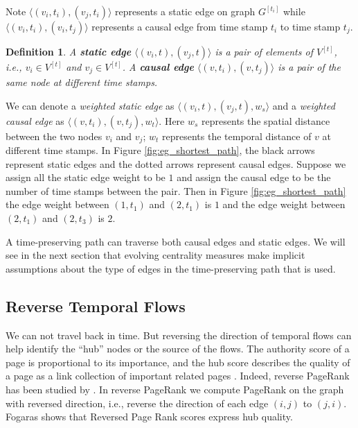 \documentclass[12pt]{article}
\newtheorem{definition}{Definition}
\theoremstyle{definition}
\begin{document}
Note $\langle (v_i, t_i), (v_j, t_i) \rangle$ represents a static edge on graph $G^{[t_i]}$ while $\langle (v_i, t_i), (v_i, t_j) \rangle$ represents a causal edge from time stamp $t_i$ to time stamp $t_j$.

\begin{definition}
A \textbf{static edge} $\langle (v_i, t), (v_j, t)\rangle$ is a pair of elements of $V^{[t]}$, i.e., $v_i \in V^{[t]}$ and
$v_j \in V^{[t]}$.
 A \textbf{causal edge} $\langle (v, t_i), (v, t_j)\rangle$ is a pair of the same node at different time stamps.
\end{definition}

We can denote a \emph{weighted static edge} as $\langle (v_i, t), (v_j, t), w_s \rangle$ and a \emph{weighted causal edge} as $\langle (v, t_i), (v, t_j), w_t \rangle$.
Here $w_s$ represents the spatial distance between the two nodes $v_i$ and $v_j$; $w_t$ represents the
temporal distance of $v$ at different time stamps.
In Figure \ref{fig:eg_shortest_path}, the black arrows represent static edges and the dotted arrows represent causal edges.
Suppose we assign all the static edge weight to be $1$ and
assign the causal edge to be the number of time stamps between the pair. Then in Figure \ref{fig:eg_shortest_path}
the edge weight between $(1, t_1)$ and $(2, t_1)$ is $1$ and the edge weight between $(2, t_1)$ and $(2, t_3)$
 is $2$.

A time-preserving path can traverse both causal edges and static edges.
We will see in the next section that evolving centrality measures make implicit assumptions about the type of edges in the
time-preserving path that is used.


\subsection{Reverse Temporal Flows}
\label{sec:reverse-temp-flows}

We can not travel back in time. But reversing the direction of temporal flows can help
identify the ``hub'' nodes or the source of the flows. The authority score of a page is
proportional to its importance, and the hub score describes the quality of a page as a link collection of important related pages \cite{kleinberg99}.
Indeed, reverse PageRank has
been studied by \cite{bar08, fogaras03, gleich15}. In reverse PageRank we compute PageRank on the graph with reversed direction, i.e., reverse the direction of each edge $(i,j)$ to $(j, i)$.
Fogaras \cite{fogaras03} shows that Reversed Page Rank scores express hub quality.
\end{document}
